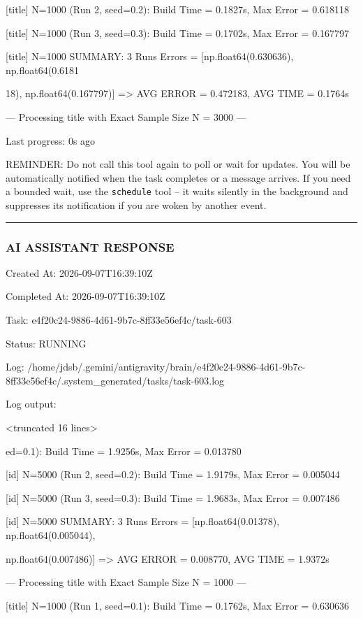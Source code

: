 \documentclass[11pt,a4paper]{article}
\begin{document}
[title] N=1000 (Run 2, seed=0.2): Build Time = 0.1827s, Max Error = 0.618118

[title] N=1000 (Run 3, seed=0.3): Build Time = 0.1702s, Max Error = 0.167797

[title] N=1000 SUMMARY: 3 Runs Errors = [np.float64(0.630636), np.float64(0.6181

18), np.float64(0.167797)] => AVG ERROR = 0.472183, AVG TIME = 0.1764s

--- Processing title with Exact Sample Size N = 3000 ---


Last progress: 0s ago



REMINDER: Do not call this tool again to poll or wait for updates. You will be automatically notified when the task completes or a message arrives. If you need a bounded wait, use the \texttt{schedule} tool -- it waits silently in the background and suppresses its notification if you are woken by another event.


\hrule

\subsubsection{AI ASSISTANT RESPONSE}

Created At: 2026-09-07T16:39:10Z

Completed At: 2026-09-07T16:39:10Z

Task: e4f20c24-9886-4d61-9b7c-8ff33e56ef4c/task-603

Status: RUNNING

Log: /home/jdsb/.gemini/antigravity/brain/e4f20c24-9886-4d61-9b7c-8ff33e56ef4c/.system\_generated/tasks/task-603.log

Log output:

<truncated 16 lines>

ed=0.1): Build Time = 1.9256s, Max Error = 0.013780

[id] N=5000 (Run 2, seed=0.2): Build Time = 1.9179s, Max Error = 0.005044

[id] N=5000 (Run 3, seed=0.3): Build Time = 1.9683s, Max Error = 0.007486

[id] N=5000 SUMMARY: 3 Runs Errors = [np.float64(0.01378), np.float64(0.005044),

np.float64(0.007486)] => AVG ERROR = 0.008770, AVG TIME = 1.9372s


--- Processing title with Exact Sample Size N = 1000 ---

[title] N=1000 (Run 1, seed=0.1): Build Time = 0.1762s, Max Error = 0.630636
\end{document}
